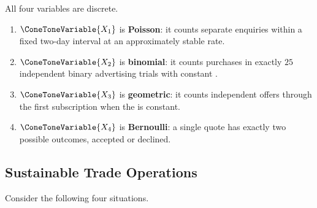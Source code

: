 	All four variables are discrete.
	\begin{enumerate}
		\item $\ConeToneVariable{X_1}$ is \textbf{Poisson}: it counts separate enquiries within a fixed two-day interval at an approximately stable rate.
		\item $\ConeToneVariable{X_2}$ is \textbf{binomial}: it counts purchases in exactly $25$ independent binary advertising trials with constant  .
		\item $\ConeToneVariable{X_3}$ is \textbf{geometric}: it counts independent offers through the first subscription when the   is constant.
		\item $\ConeToneVariable{X_4}$ is \textbf{Bernoulli}: a single quote has exactly two possible outcomes, accepted or declined.
	\end{enumerate}


	\subsection{Sustainable Trade Operations}
	\label{sec:sustainable-trade-operations}

	Consider the following four situations.

